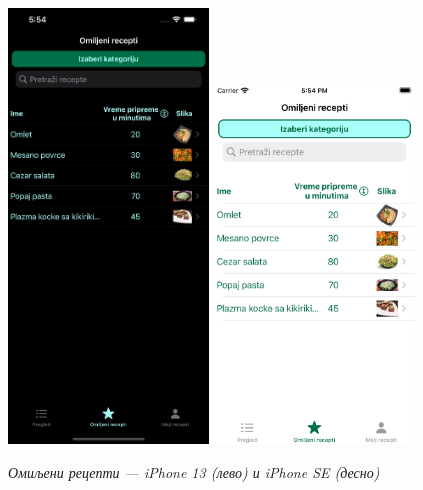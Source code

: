 \documentclass[12pt,oneside]{memoir}
\begin{document}
\begin{figure} [H]
    \centering
    \captionsetup{justification=centering}
    \includegraphics[width=0.475\textwidth]{images/simulators/view images/dark - favorites.png} 
    \hfill
    \includegraphics[width=0.475\textwidth]{images/simulators/view images/light - favorites.png}
    \caption{\textit{Омиљени рецепти --- iPhone 13 (лево) и iPhone SE (десно)}}
    \label{slika:омиљени_1}
\end{figure}
\end{document}
